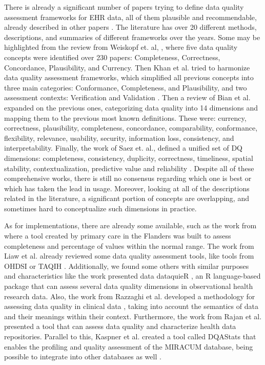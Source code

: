 There is already a significant number of papers trying to define data quality assessment frameworks for EHR data, all of them plausible and recommendable, already described in other papers \cite{bianAssessingPracticeData2020}. The literature has over 20 different methods, descriptions, and summaries of different frameworks over the years. Some may be highlighted from the review from Weiskopf et. al, \cite{weiskopfMethodsDimensionsElectronic2013}, where five data quality concepts were identified over 230 papers: Completeness, Correctness, Concordance, Plausibility, and Currency. 
Then Khan et al. tried to harmonize data quality assessment frameworks, which simplified all previous concepts into three main categories: Conformance, Completeness, and Plausibility, and two assessment contexts: Verification and Validation \cite{kahnHarmonizedDataQuality2016a}.
Then a review of Bian et al.  \cite{bianAssessingPracticeData2020} expanded on the previous ones, categorizing data quality into 14 dimensions and mapping them to the previous most known definitions. These were: currency, correctness, plausibility, completeness, concordance, comparability, conformance, flexibility, relevance, usability, security, information loss, consistency, and interpretability. 
Finally, the work of Saez et. al., defined a unified set of DQ dimensions: completeness, consistency, duplicity, correctness, timeliness, spatial stability, contextualization, predictive value and reliability \cite{saOrganizingDataQuality2012}.
Despite all of these comprehensive works, there is still no consensus regarding which one is best or which has taken the lead in usage. Moreover, looking at all of the descriptions related in the literature, a significant portion of concepts are overlapping, and sometimes hard to conceptualize such dimensions in practice. 

As for implementations, there are already some available, such as the work from \cite{phanAutomatedDataCleaning2020} where a tool created by primary care in the Flanders was built to assess completeness and percentage of values within the normal range.
The work from Liaw et al. \cite{liawQualityAssessmentRealworld2021} already reviewed some data quality assessment tools, like tools from OHDSI \cite{hripcsakObservationalHealthData2015} or TAQIH \cite{alvarezsanchezTAQIHToolTabular2019}. 
Additionally, we found some others with similar purposes and characteristics like the work presented data dataquieR \cite{schmidtFacilitatingHarmonizedData2021}, an R language-based package that can assess several data quality dimensions in observational health research data. 
Also, the work from Razzaghi et al. developed a methodology for assessing data quality in clinical data \cite{razzaghiDevelopingSystematicApproach2022}, taking into account the semantics of data and their meanings within their context. Furthermore, the work from Rajan et al. \cite{rajanContentAgnosticComputable2019} presented a tool that can assess data quality and characterize health data repositories. Parallel to this, Kaspner et al. created a tool called DQAStats that enables the profiling and quality assessment of the MIRACUM database, being possible to integrate into other databases as well \cite{kapsnerLinkingConsortiumWideData2021a}.

